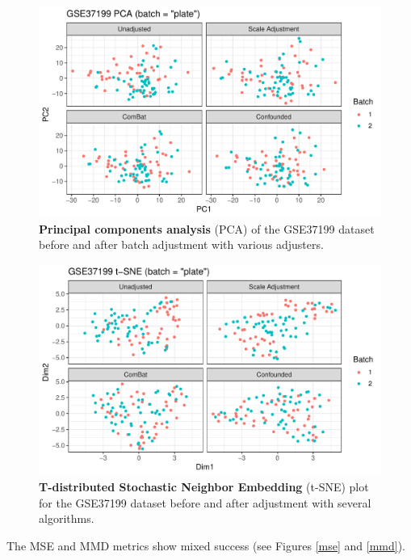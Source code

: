 \documentclass[notitlepage]{article}
\begin{document}
\begin{figure}
	\centering
	\includegraphics[width=\columnwidth]{figures/final/pca}
	\caption{\textbf{Principal components analysis} (PCA) of the GSE37199 dataset before and after batch adjustment with various adjusters.}
	\label{fig:pca}
\end{figure}
\begin{figure}
	\centering
	\includegraphics[width=\columnwidth]{figures/final/tsne}
	\caption{\textbf{T-distributed Stochastic Neighbor Embedding} (t-SNE) plot for the GSE37199 dataset before and after adjustment with several algorithms.}
	\label{fig:tsne}
\end{figure}

The MSE and MMD metrics show mixed success (see Figures \ref{mse} and \ref{mmd}).
\end{document}
